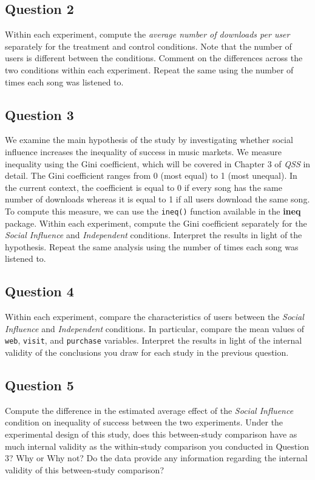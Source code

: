 \documentclass[]{article}
\begin{document}
\subsection{Question 2}\label{question-2}

Within each experiment, compute the \emph{average number of downloads
per user} separately for the treatment and control conditions. Note that
the number of users is different between the conditions. Comment on the
differences across the two conditions within each experiment. Repeat the
same using the number of times each song was listened to.

\subsection{Question 3}\label{question-3}

We examine the main hypothesis of the study by investigating whether
social influence increases the inequality of success in music markets.
We measure inequality using the Gini coefficient, which will be covered
in Chapter 3 of \emph{QSS} in detail. The Gini coefficient ranges from 0
(most equal) to 1 (most unequal). In the current context, the
coefficient is equal to 0 if every song has the same number of downloads
whereas it is equal to 1 if all users download the same song. To compute
this measure, we can use the \texttt{ineq()} function available in the
\textbf{ineq} package. Within each experiment, compute the Gini
coefficient separately for the \emph{Social Influence} and
\emph{Independent} conditions. Interpret the results in light of the
hypothesis. Repeat the same analysis using the number of times each song
was listened to.

\subsection{Question 4}\label{question-4}

Within each experiment, compare the characteristics of users between the
\emph{Social Influence} and \emph{Independent} conditions. In
particular, compare the mean values of \texttt{web}, \texttt{visit}, and
\texttt{purchase} variables. Interpret the results in light of the
internal validity of the conclusions you draw for each study in the
previous question.

\subsection{Question 5}\label{question-5}

Compute the difference in the estimated average effect of the
\emph{Social Influence} condition on inequality of success between the
two experiments. Under the experimental design of this study, does this
between-study comparison have as much internal validity as the
within-study comparison you conducted in Question 3? Why or Why not? Do
the data provide any information regarding the internal validity of this
between-study comparison?
\end{document}
